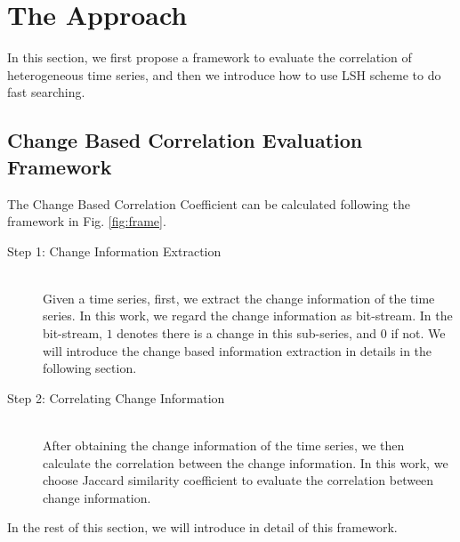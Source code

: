 \section{The Approach}
\label{sec:framework}
In this section, we first propose a framework to evaluate the correlation of heterogeneous time series, and then we introduce how to use LSH scheme to do fast searching.

\subsection{Change Based Correlation Evaluation Framework}

The Change Based Correlation Coefficient can be calculated following the framework in Fig. \ref{fig:frame}.

\begin{description}
  \item[Step 1: Change Information Extraction] \hfill \\
  Given a time series, first, we extract the change information of the time series. 
  In this work, we regard the change information as bit-stream. In the bit-stream, $1$ denotes there is a change in this sub-series, and $0$ if not. 
  We will introduce the change based information extraction in details in the following section.
  \item[Step 2: Correlating Change Information] \hfill \\
  After obtaining the change information of the time series, we then calculate the correlation between the change information. In this work, we choose Jaccard similarity\cite{han2011data} coefficient to evaluate the correlation between change information.
\end{description}

In the rest of this section, we will introduce in detail of this framework.


